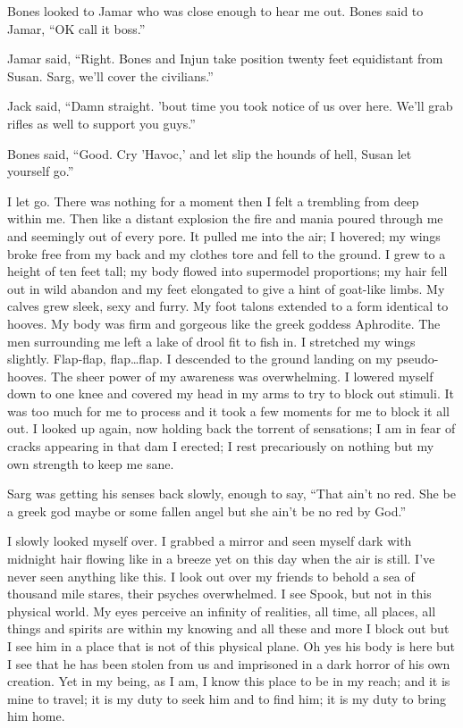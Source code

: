 Bones looked to Jamar who was close enough to hear me out. Bones said to Jamar, ``OK call it boss.''

Jamar said, ``Right. Bones and Injun take position twenty feet equidistant from Susan. Sarg, we'll cover the civilians.''

Jack said, ``Damn straight. 'bout time you took notice of us over here. We'll grab rifles as well to support you guys.''

Bones said, ``Good. Cry 'Havoc,' and let slip the hounds of hell, Susan let yourself go.''


\parasep

I let go. There was nothing for a moment then I felt a trembling from deep within me. Then like a distant explosion the fire and mania poured through me and seemingly out of every pore. It pulled me into the air; I hovered; my wings broke free from my back and my clothes tore and fell to the ground. I grew to a height of ten feet tall; my body flowed into supermodel proportions; my hair fell out in wild abandon and my feet elongated to give a hint of goat-like limbs. My calves grew sleek, sexy and furry. My foot talons extended to a form identical to hooves. My body was firm and gorgeous like the greek goddess Aphrodite. The men surrounding me left a lake of drool fit to fish in. I stretched my wings slightly. Flap-flap, flap\dots flap. I descended to the ground landing on my pseudo-hooves. The sheer power of my awareness was overwhelming. I lowered myself down to one knee and covered my head in my arms to try to block out stimuli. It was too much for me to process and it took a few moments for me to block it all out. I looked up again, now holding back the torrent of sensations; I am in fear of cracks appearing in that dam I erected; I rest precariously on nothing but my own strength to keep me sane.

Sarg was getting his senses back slowly, enough to say, ``That ain't no red. She be a greek god maybe or some fallen angel but she ain't be no red by God.''

I slowly looked myself over. I grabbed a mirror and seen myself dark with midnight hair flowing like in a breeze yet on this day when the air is still. I've never seen anything like this. I look out over my friends to behold a sea of thousand mile stares, their psyches overwhelmed. I see Spook, but not in this physical world. My eyes perceive an infinity of realities, all time, all places, all things and spirits are within my knowing and all these and more I block out but I see him in a place that is not of this physical plane. Oh yes his body is here but I see that he has been stolen from us and imprisoned in a dark horror of his own creation. Yet in my being, as I am, I know this place to be in my reach; and it is mine to travel; it is my duty to seek him and to find him; it is my duty to bring him home.

